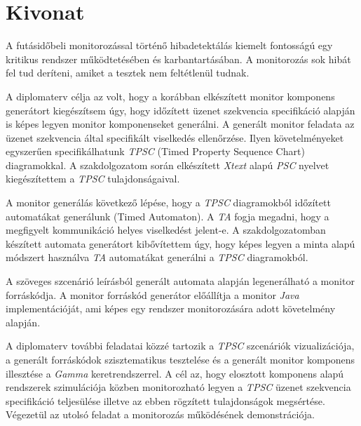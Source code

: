 \setcounter{page}{1}

\selecthungarian

\chapter*{Kivonat}

A futásidőbeli monitorozással történő hibadetektálás kiemelt fontosságú egy kritikus rendszer működtetésében és karbantartásában.
A monitorozás sok hibát fel tud deríteni, amiket a tesztek nem feltétlenül tudnak.

A diplomaterv célja az volt, hogy a korábban elkészített monitor komponens generátort kiegészítsem úgy, hogy időzített üzenet szekvencia specifikáció alapján is képes legyen monitor komponenseket generálni.
A generált monitor feladata az üzenet szekvencia által specifikált viselkedés ellenőrzése.
Ilyen követelményeket egyszerűen specifikálhatunk \textit{TPSC} (Timed Property Sequence Chart) diagramokkal.
A szakdolgozatom során elkészített \textit{Xtext} alapú \textit{PSC} nyelvet kiegészítettem a \textit{TPSC} tulajdonságaival.

A monitor generálás következő lépése, hogy a \textit{TPSC} diagramokból időzített automatákat generálunk (Timed Automaton).
A \textit{TA} fogja megadni, hogy a megfigyelt kommunikáció helyes viselkedést jelent-e.
A szakdolgozatomban készített automata generátort kibővítettem úgy, hogy képes legyen a minta alapú módszert használva \textit{TA} automatákat generálni a \textit{TPSC} diagramokból.

A szöveges szcenárió leírásból generált automata alapján legenerálható a monitor forráskódja.
A monitor forráskód generátor előállítja a monitor \textit{Java} implementációját, ami képes egy rendszer monitorozására adott követelmény alapján.

A diplomaterv további feladatai közzé tartozik a \textit{TPSC} szcenáriók vizualizációja, a generált forráskódok szisztematikus tesztelése és a generált monitor komponens illesztése a \textit{Gamma} keretrendszerrel.
A cél az, hogy elosztott komponens alapú rendszerek szimulációja közben monitorozható legyen a \textit{TPSC} üzenet szekvencia specifikáció teljesülése illetve az ebben rögzített tulajdonságok megsértése.
Végezetül az utolsó feladat a monitorozás működésének demonstrációja.

